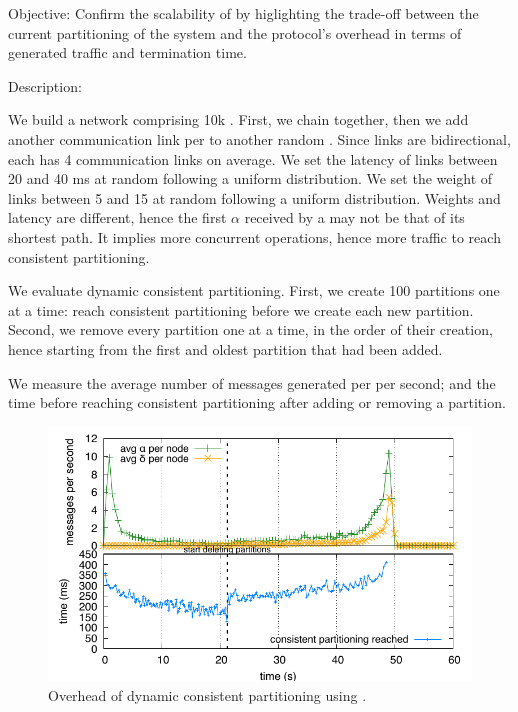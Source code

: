 \begin{asparadesc}
\item [Objective:] Confirm the scalability of \NAME by higlighting the
  trade-off between the current partitioning of the system and the
  protocol's overhead in terms of generated traffic and termination
  time.
  
\item [Description:]
  
We build a network comprising 10k \processes. First, we chain
\processes together, then we add another communication link per
\process to another random \process. Since links are bidirectional,
each \process has 4 communication links on average. We set the latency
of links between 20 and 40 ms at random following a uniform
distribution. We set the weight of links between 5 and 15 at random
following a uniform distribution. Weights and latency are different,
hence the first $\alpha$ received by a \process may not be that of its
shortest path. It implies more concurrent operations, hence more
traffic to reach consistent partitioning.

\noindent We evaluate dynamic consistent partitioning. First, we
create 100 partitions one at a time: \processes reach consistent
partitioning before we create each new partition. Second, we remove
every partition one at a time, in the order of their creation, hence
starting from the first and oldest partition that had been added.

\noindent We measure the average number of messages generated per
\process per second; and the time before reaching consistent
partitioning after adding or removing a partition.

\begin{figure}
  \centering\includegraphics[width=\FIGSCALE\columnwidth]{img/as_cast_complexity.pdf}
  \caption{\label{fig:complexity}Overhead of dynamic consistent partitioning
    using \NAME.}
  

\end{figure}
\end{asparadesc}
